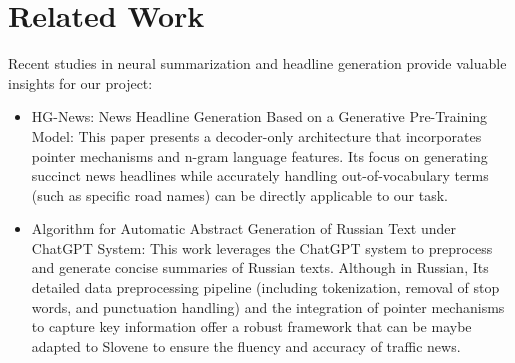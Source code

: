 \documentclass[fleqn,moreauthors,10pt]{ds_report}
\begin{document}
\section{Related Work}
Recent studies in neural summarization and headline generation provide valuable insights for our project:
\begin{itemize}
    \item HG-News: News Headline Generation Based on a Generative Pre-Training Model: This paper presents a decoder-only architecture that incorporates pointer mechanisms and n-gram language features. Its focus on generating succinct news headlines while accurately handling out-of-vocabulary terms (such as specific road names) can be directly applicable to our task. \cite{liHGNewsNewsHeadline2021}

    \item Algorithm for Automatic Abstract Generation of Russian Text under ChatGPT System: This work leverages the ChatGPT system to preprocess and generate concise summaries of Russian texts. Although in Russian, Its detailed data preprocessing pipeline (including tokenization, removal of stop words, and punctuation handling) and the integration of pointer mechanisms to capture key information offer a robust framework that can be maybe adapted to Slovene to ensure the fluency and accuracy of traffic news. \cite{houAlgorithmAutomaticAbstract2024}
\end{itemize}
\end{document}
